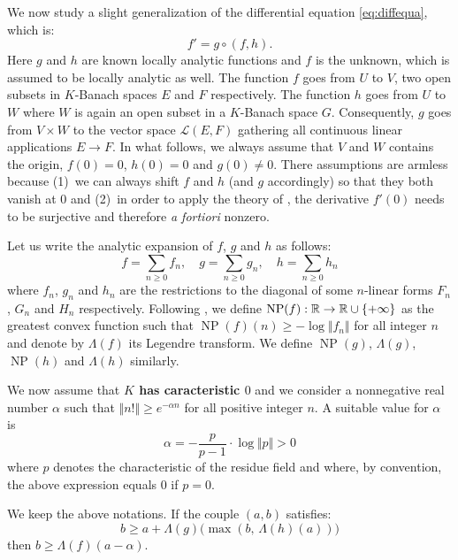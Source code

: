 \documentclass{sig-alternate}
\DeclareMathOperator{\NP}{NP}
\begin{document}
We now study a slight generalization of the differential equation 
\eqref{eq:diffequa}, which is:
\begin{equation}
\label{eq:diffequah}
f' = g \circ (f, h).
\end{equation}
Here $g$ and $h$ are known locally analytic functions and $f$ is the 
unknown, which is assumed to be locally analytic as well. The function
$f$ goes from $U$ to $V$, two open subsets in $K$-Banach spaces $E$ 
and $F$ respectively. The function $h$ goes from $U$ to $W$ where $W$
is again an open subset in a $K$-Banach space $G$. Consequently, $g$
goes from $V \times W$ to the vector space $\mathcal L(E,F)$ gathering
all continuous linear applications $E \to F$.
In what follows, we always assume that $V$ and $W$ contains the origin, 
$f(0) = 0$, $h(0) = 0$ and $g(0) \neq 0$. There assumptions are armless 
because (1)~we can always shift $f$ and $h$ (and $g$ accordingly) so 
that they both vanish at $0$ and (2)~in order to apply the theory of 
\cite{padicprec}, the derivative $f'(0)$ needs to be surjective and 
therefore \emph{a fortiori} nonzero.

Let us write the analytic expansion of $f$, $g$ and $h$ as follows: 
$$f = \sum_{n \geq 0} f_n, \quad
g = \sum_{n \geq 0} g_n, \quad
h = \sum_{n \geq 0} h_n$$
where $f_n$, $g_n$ and $h_n$ are the restrictions to the diagonal of 
some $n$-linear forms $F_n$, $G_n$ and $H_n$ respectively.
Following \cite{padicprec}, we define $\NP(f) : \R \to \R \cup 
\{+\infty\}$ as the greatest convex function such that $\NP(f)(n) \geq - 
\log \Vert f_n \Vert$ for all integer $n$ and denote by $\Lambda(f)$ its 
Legendre transform. We define $\NP(g)$, $\Lambda(g)$, $\NP(h)$ and
$\Lambda(h)$ similarly.

We now assume that \textbf{$K$ has caracteristic $0$} and we consider a 
nonnegative real number $\alpha$ such that $\Vert n! \Vert \geq 
e^{-\alpha n}$ for all positive integer $n$. A suitable value for 
$\alpha$ is
$$\alpha = - \frac p {p-1} \cdot \log \Vert p \Vert > 0$$
where $p$ denotes the characteristic of the residue field and
where, by convention, the above expression equals $0$ if $p = 0$.

\begin{prop}
\label{prop:boundLambdaf}
We keep the above notations. If the couple $(a,b)$ satisfies:
\begin{equation}
\label{eq:condAB}
b \geq a + \Lambda(g)\big( \! \max(b, \, \Lambda(h) (a)) \big)
\end{equation}
then $b \geq \Lambda(f)(a - \alpha)$.
\end{prop}
\end{document}
